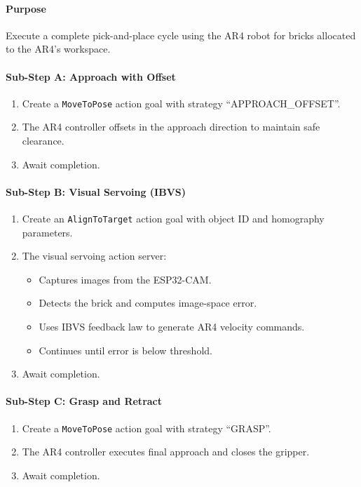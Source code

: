 \paragraph{Purpose}

Execute a complete pick-and-place cycle using the AR4 robot for bricks allocated to the AR4's workspace.

\paragraph{Sub-Step A: Approach with Offset}

\begin{enumerate}
    \item Create a \texttt{MoveToPose} action goal with strategy ``APPROACH\_OFFSET''.
    \item The AR4 controller offsets in the approach direction to maintain safe clearance.
    \item Await completion.
\end{enumerate}

\paragraph{Sub-Step B: Visual Servoing (IBVS)}

\begin{enumerate}
    \item Create an \texttt{AlignToTarget} action goal with object ID and homography parameters.
    \item The visual servoing action server:
    \begin{itemize}
        \item Captures images from the ESP32-CAM.
        \item Detects the brick and computes image-space error.
        \item Uses IBVS feedback law to generate AR4 velocity commands.
        \item Continues until error is below threshold.
    \end{itemize}
    \item Await completion.
\end{enumerate}

\paragraph{Sub-Step C: Grasp and Retract}

\begin{enumerate}
    \item Create a \texttt{MoveToPose} action goal with strategy ``GRASP''.
    \item The AR4 controller executes final approach and closes the gripper.
    \item Await completion.
\end{enumerate}


